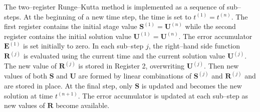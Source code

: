 \documentclass[dvips]{article}
\begin{document}
The two--register Runge--Kutta method is implemented as a sequence of
sub--steps.  At the beginning of a new time step, the time is set to
$t^{(1)}=t^{(n)}$.  The first register contains the initial stage value
${\mathbf S}^{(1)} = {\mathbf U}^{(n)}$ while the second register contains
the initial solution value ${\mathbf U}^{(1)} = {\mathbf U}^{(n)}$. 
The error accumulator ${\mathbf E}^{(1)}$ is set initially to zero.  In
each sub--step $j$, the right--hand side function ${\mathbf R}^{(j)}$ is
evaluated using the current time and the current solution value
${\mathbf U}^{(j)}$.  The new value of ${\mathbf R}^{(j)}$ is stored in
Register 2, overwriting ${\mathbf U}^{(j)}$.  Then new values of both 
${\mathbf S}$ and ${\mathbf U}$ are formed by linear combinations of
${\mathbf S}^{(j)}$ and ${\mathbf R^{(j)}}$ and are stored in place.
At the final step, only ${\mathbf S}$ is updated and becomes the new
solution at time $t^{(n+1)}$.  The error accumulator is updated at each
sub--step as new values of ${\mathbf R}$ become available.
\end{document}

